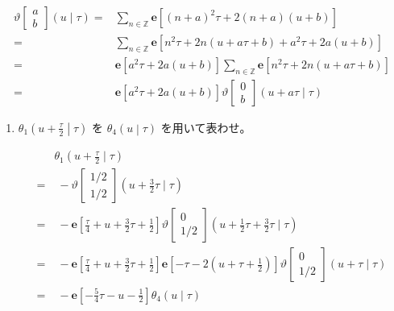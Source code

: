 \documentclass[12pt,b5paper]{ltjsarticle}
\begin{document}
\begin{enumerate}
\begin{enumerate}
              \dotfill

              \begin{align}
                \vartheta \begin{bmatrix} a \\ b \end{bmatrix} (u \mid \tau)
                =& \sum_{n\in\mathbb{Z}} \mathbf{e}
                 \left[ (n+a)^{2}\tau + 2(n+a)(u+b) \right]\\
                =& \sum_{n\in\mathbb{Z}} \mathbf{e}
                 \left[ n^{2}\tau +2n(u+a\tau+b)+ a^{2}\tau + 2a(u+b) \right]\\
                =& \mathbf{e}[a^{2}\tau + 2a(u+b) ] \sum_{n\in\mathbb{Z}}
                  \mathbf{e} [ n^{2}\tau +2n(u+a\tau+b)]\\
                =& \mathbf{e}[a^{2}\tau + 2a(u+b) ]
                \vartheta \begin{bmatrix} 0 \\ b \end{bmatrix} (u+a\tau \mid \tau)
              \end{align}

              \dotfill
             \begin{enumerate}
              \item $\displaystyle \theta_{1} \left(u+\frac{\tau}{2} \middle| \tau \right)$
                    を
                    $\displaystyle \theta_{4} \left(u \middle| \tau \right)$
                    を用いて表わせ。

                    \dotfill

                    \begin{align}
                     & \theta_{1}(u + \frac{\tau}{2} \mid \tau)\\
                        =&\; -\vartheta \begin{bmatrix} 1/2 \\ 1/2 \end{bmatrix} (u+\frac{3}{2}\tau \mid \tau)\\
                        =&\; -\mathbf{e}[\frac{\tau}{4}+u+\frac{3}{2}\tau+\frac{1}{2}]
                          \vartheta \begin{bmatrix} 0 \\ 1/2 \end{bmatrix} (u+\frac{1}{2}\tau+\frac{3}{2}\tau \mid \tau)\\
                        =&\; -\mathbf{e}[\frac{\tau}{4}+u+\frac{3}{2}\tau+\frac{1}{2}]
                     \mathbf{e}[-\tau-2(u+\tau+\frac{1}{2})]
                     \vartheta \begin{bmatrix} 0 \\ 1/2 \end{bmatrix} (u+\tau \mid \tau)\\
                        =&\; -\mathbf{e}[-\frac{5}{4}\tau-u-\frac{1}{2}]\theta_{4}(u\mid\tau)
                    \end{align}


\end{enumerate}
\end{enumerate}
\end{enumerate}
\end{document}
